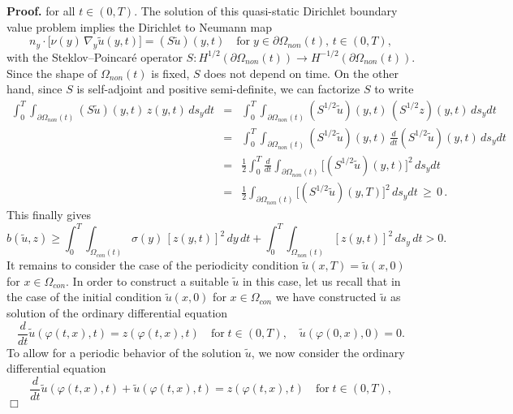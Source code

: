 \documentclass[12pt]{article}
\newenvironment{proof}{\textbf{Proof.}}{\hfill $\Box$}
\numberwithin{equation}{section}
\begin{document}
\begin{proof}
  for all $t \in (0,T)$. The solution of this
  quasi-static Dirichlet boundary value problem implies the
  Dirichlet to Neumann map
  \[
    n_y \cdot \Big[ \nu(y) \, \nabla_y \widetilde{u}(y,t) \Big] =
    (S \widetilde{u})(y,t) \quad
    \mbox{for} \; y \in \partial \Omega_{non}(t), \, t \in (0,T),
  \]
  with the Steklov--Poincar\'e operator
  $S : H^{1/2}(\partial \Omega_{non}(t)) \to H^{-1/2}(\partial \Omega_{non}(t))$.
  Since the shape of $\Omega_{non}(t)$ is fixed, $S$ does not
  depend on time. On the other hand, since $S$ is self-adjoint and
  positive semi-definite, we can factorize $S$ to write
  \begin{eqnarray*}
    \int_0^T \int_{\partial \Omega_{non}(t)}
    (S \widetilde{u})(y,t) \, z(y,t) \, ds_y dt
    & = &
    \int_0^T \int_{\partial \Omega_{non}(t)}
    (S^{1/2} \widetilde{u})(y,t) \,
          (S^{1/2} z)(y,t) \, ds_y dt \\
    & = & 
    \int_0^T \int_{\partial \Omega_{non}(t)}
    (S^{1/2} \widetilde{u})(y,t) \, \frac{d}{dt}
    (S^{1/2} \widetilde{u})(y,t) \, ds_y dt \\
    & = & \frac{1}{2}
    \int_0^T \frac{d}{dt} \int_{\partial \Omega_{non}(t)}
        \Big[
        (S^{1/2} \widetilde{u})(y,t) \Big]^2
        \, ds_y dt \\
    & = & \frac{1}{2}
        \int_{\partial \Omega_{non}(t)}
        \Big[
        (S^{1/2} \widetilde{u})(y,T) \Big]^2
        \, ds_y dt \, \geq \, 0 \, .
  \end{eqnarray*}
  This finally gives
  \[
    b(\widetilde{u},z)
    \geq
    \int_0^T \int_{\Omega_{con}(t)} \sigma(y) \,
    [z(y,t)]^2 \, dy \, dt +
    \int_0^T \int_{\Omega_{non}(t)} [z(y,t)]^2 \,
    d s_y \, dt > 0 .
  \]
  It remains to consider the case of the periodicity condition
  $\widetilde{u}(x,T)=\widetilde{u}(x,0)$ for $x \in \Omega_{con}$.
  In order to construct a suitable $\widetilde{u}$ in this case,
  let us recall that in the case of the initial condition
  $\widetilde{u}(x,0)$ for $x \in \Omega_{con}$ we have constructed
  $\widetilde{u}$ as solution of the ordinary differential equation
  \[
    \frac{d}{dt}
    \widetilde{u}(\varphi(t,x),t)
    =
    z(\varphi(t,x),t) \quad
    \mbox{for} \; t \in (0,T), \quad
    \widetilde{u}(\varphi(0,x),0)
    = 0 .
  \]
  To allow for a periodic behavior of the solution $\widetilde{u}$,
  we now consider the ordinary differential equation
  \[
    \frac{d}{dt}
    \widetilde{u}(\varphi(t,x),t)
    +
    \widetilde{u}(\varphi(t,x),t)
    =
    z(\varphi(t,x),t) \quad
    \mbox{for} \; t \in (0,T), 
\]
\end{proof}
\end{document}
